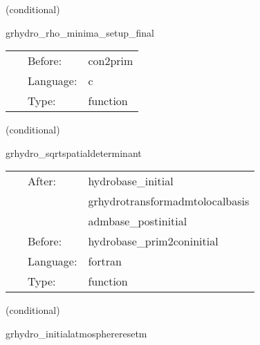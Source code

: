 \documentclass{article}
\begin{document}
\vspace{5mm}

   (conditional) 

\hspace{5mm} grhydro\_rho\_minima\_setup\_final 

\hspace{5mm}{\it set the value of the rest-mass density of the atmosphere which will be used during the evolution } 


\hspace{5mm}

 \begin{tabular*}{160mm}{cll} 
~ & Before:  & con2prim \\ 
~ & Language:  & c \\ 
~ & Type:  & function \\ 
\end{tabular*} 


\vspace{5mm}

   (conditional) 

\hspace{5mm} grhydro\_sqrtspatialdeterminant 

\hspace{5mm}{\it calculate sdetg } 


\hspace{5mm}

 \begin{tabular*}{160mm}{cll} 
~ & After:  & hydrobase\_initial \\ 
~& ~ &grhydrotransformadmtolocalbasis\\ 
~& ~ &admbase\_postinitial\\ 
~ & Before:  & hydrobase\_prim2coninitial \\ 
~ & Language:  & fortran \\ 
~ & Type:  & function \\ 
\end{tabular*} 


\vspace{5mm}

   (conditional) 

\hspace{5mm} grhydro\_initialatmosphereresetm 

\hspace{5mm}{\it use mask to enforce atmosphere at initial time } 


\hspace{5mm}
\end{document}
